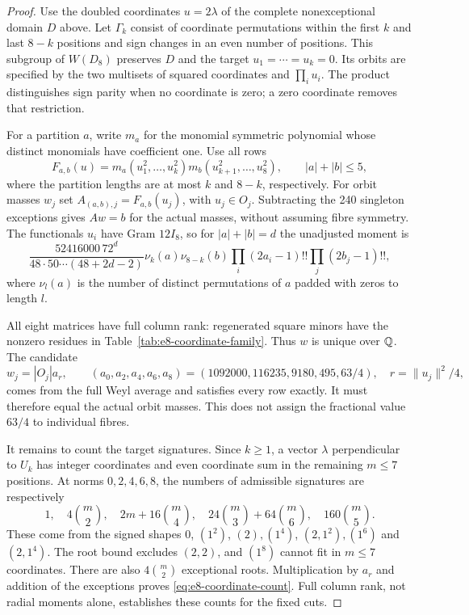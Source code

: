 \begin{proof}
Use the doubled coordinates $u=2\lambda$ of the complete
nonexceptional domain $D$ above. Let $\Gamma_k$ consist of coordinate
permutations within the first $k$ and last $8-k$ positions and sign
changes in an even number of positions. This subgroup of $W(D_8)$
preserves $D$ and the target $u_1=\cdots=u_k=0$. Its orbits are
specified by the two multisets of squared coordinates and $\prod_i u_i$.
The product distinguishes sign parity when no coordinate is zero;
a zero coordinate removes that restriction.

For a partition $a$, write $m_a$ for the monomial symmetric polynomial
whose distinct monomials have coefficient one. Use all rows
\[
 F_{a,b}(u)=m_a(u_1^2,\ldots,u_k^2)
           m_b(u_{k+1}^2,\ldots,u_8^2),\qquad
 |a|+|b|\le5,
\]
where the partition lengths are at most $k$ and $8-k$, respectively.
For orbit masses $w_j$ set $A_{(a,b),j}=F_{a,b}(u_j)$, with
$u_j\in O_j$. Subtracting the 240 singleton exceptions gives $Aw=b$
for the actual masses, without assuming fibre symmetry. The functionals
$u_i$ have Gram $12I_8$, so for $|a|+|b|=d$ the unadjusted moment is
\begin{equation}\label{eq:e8-coordinate-moment}
 \frac{52416000\,72^d}{48\cdot50\cdots(48+2d-2)}
 \nu_k(a)\nu_{8-k}(b)
 \prod_i(2a_i-1)!!\prod_j(2b_j-1)!!,
\end{equation}
where $\nu_l(a)$ is the number of distinct permutations of $a$
padded with zeros to length $l$.

All eight matrices have full column rank: regenerated square minors
have the nonzero residues in Table~\ref{tab:e8-coordinate-family}.
Thus $w$ is unique over $\mathbb Q$. The candidate
\[
 w_j=|O_j|a_r,\qquad
 (a_0,a_2,a_4,a_6,a_8)=(1092000,116235,9180,495,63/4),
 \quad r=\|u_j\|^2/4,
\]
comes from the full Weyl average and satisfies every row exactly.
It must therefore equal the actual orbit masses. This does not assign
the fractional value $63/4$ to individual fibres.

It remains to count the target signatures. Since $k\ge1$, a vector
$\lambda$ perpendicular to $U_k$ has integer coordinates and even
coordinate sum in the remaining $m\le7$ positions. At norms
$0,2,4,6,8$, the numbers of admissible signatures are respectively
\[
 1,\quad 4\binom m2,\quad 2m+16\binom m4,\quad
 24\binom m3+64\binom m6,\quad 160\binom m5.
\]
These come from the signed shapes
$0$, $(1^2)$, $(2),(1^4)$, $(2,1^2),(1^6)$ and $(2,1^4)$.
The root bound excludes $(2,2)$, and $(1^8)$ cannot fit in $m\le7$
coordinates. There are also $4\binom m2$ exceptional roots.
Multiplication by $a_r$ and addition of the exceptions proves
\eqref{eq:e8-coordinate-count}. Full column rank, not radial moments
alone, establishes these counts for the fixed cuts.


\end{proof}
